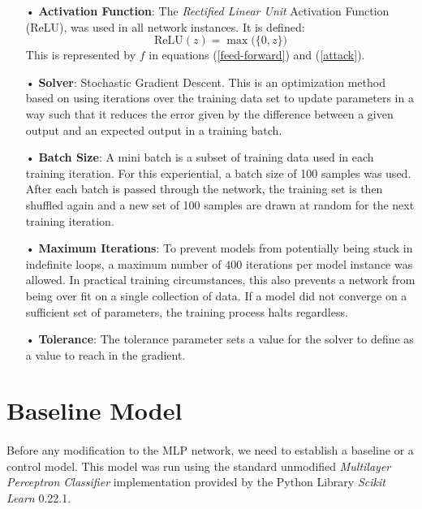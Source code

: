 \documentclass[12pt,letterpaper]{article}
\begin{document}
\begin{itemize}

\item[•]\textbf{Activation Function}: The \textit{Rectified Linear Unit} Activation Function (ReLU), was used in all network instances. It is defined:
\begin{equation}
\label{ReLU}
\text{ReLU}(z) = \max \big( \{0,z\} \big)
\end{equation}
This is represented by $f$ in equations (\ref{feed-forward}) and (\ref{attack}).

\item[•]\textbf{Solver}: Stochastic Gradient Descent. This is an optimization method based on using iterations over the training data set to update parameters in a way such that it reduces the error given by the difference between a given output and an expected output in a training batch.

\item[•]\textbf{Batch Size}: A mini batch is a subset of training data used in each training iteration. For this experiential, a batch size of 100 samples was used. After each batch is passed through the network, the training set is then shuffled again and a new set of 100 samples are drawn at random for the next training iteration.

\item[•]\textbf{Maximum Iterations}: To prevent models from potentially being stuck in indefinite loops, a maximum number of $400$ iterations per model instance was allowed. In practical training circumstances, this also prevents a network from being over fit on a single collection of data. If a model did not converge on a sufficient set of parameters, the training process halts regardless.

\item[•]\textbf{Tolerance}: The tolerance parameter sets a value for the solver to define as a value to reach in the gradient.



\end{itemize}


\section*{Baseline Model}

\paragraph*{}Before any modification to the MLP network, we need to establish a baseline or a control model. This model was run using the standard unmodified \textit{Multilayer Perceptron Classifier} implementation provided by the Python Library \textit{Scikit Learn} 0.22.1. 
\end{document}
